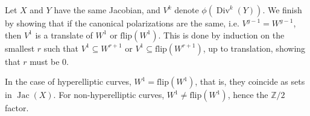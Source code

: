 \documentclass[12pt,reqno]{amsart}
\DeclareMathOperator{\Jac}{Jac}
\DeclareMathOperator{\Div}{Div}
\newcommand{\Z}{\mathbb{Z}}
\newtheorem{theorem}{Theorem}
\theoremstyle{definition}
\theoremstyle{remark}
\newcommand{\ti}{\todo[inline]}
\begin{document}
Let $X$ and $Y$ have the same Jacobian, and $V^{k}$ denote $\phi(\Div^k(Y))$. We finish by showing that if the canonical polarizations are the same, i.e. $V^{g-1} = W^{g-1}$, then $V^1$ is a translate of $W^1$ or $\text{flip}(W^1)$. This is done by induction on the smallest $r$ such that $V^1 \subseteq W^{r+1}$ or $V^1 \subseteq \text{flip}(W^{r+1})$, up to translation, showing that $r$ must be 0.


 In the case of hyperelliptic curves, $W^1 = \text{flip}(W^1)$, that is, they coincide as sets in $\Jac(X)$. For non-hyperelliptic curves, $W^1 \neq \text{flip}(W^1)$, hence the $\Z/2$ factor. 

\end{document}
